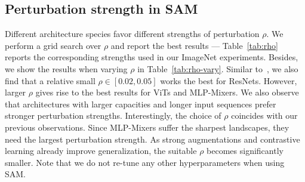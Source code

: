 \begin{table}
    \caption{Hyperparameters for training from scratch on ImageNet with basic Inception-style preprocessing and $224\times 224$ image resolution. 
    }
    \label{tab:details}
    \centering
\end{table}



\subsection{Perturbation strength in SAM}
Different architecture species favor different strengths of perturbation $\rho$.
We perform a grid search over $\rho$ and report the best results --- Table~\ref{tab:rho} reports the corresponding strengths used in our ImageNet experiments. Besides, we  show the results when varying $\rho$ in Table~\ref{tab:rho-vary}.
Similar to~\cite{foret2021sharpnessaware}, we also find that a relative small $\rho \in [0.02, 0.05]$ works the best for ResNets.
However, larger $\rho$ gives rise to the best results for ViTs and MLP-Mixers.
We also observe that architectures with larger capacities and longer input sequences prefer stronger perturbation strengths.
Interestingly, the choice of $\rho$ coincides with our previous observations.
Since MLP-Mixers suffer the sharpest landscapes, they need the largest perturbation strength.
As strong augmentations and contrastive learning already improve generalization, the suitable $\rho$ becomes significantly smaller.
Note that we do not re-tune any other hyperparameters when using SAM. 




